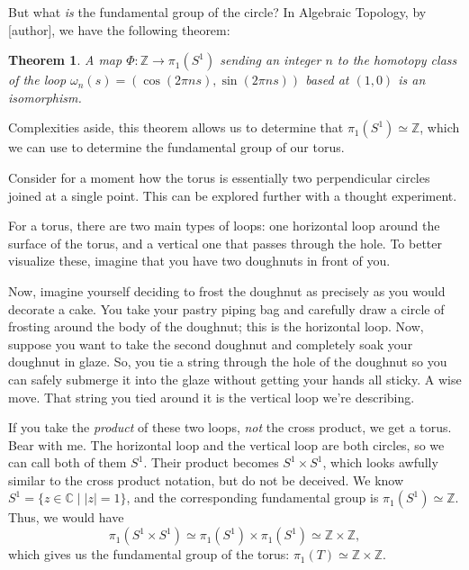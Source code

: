 \documentclass[12pt,a4paper,reqno,parskip=full]{amsart}
\numberwithin{equation}{section}
\theoremstyle{plain}
\newtheorem{theorem}[subsection]{Theorem}
\theoremstyle{definition}
\def\Z{{\mathbb Z}}
\def\C{{\mathbb C}}
\begin{document}
But what \textit{is} the fundamental group of the circle? In Algebraic Topology, by [author], we have the following theorem: %
\begin{theorem}
A map $\Phi:\Z\to\pi_1(S^1)$ sending an integer $n$ to the homotopy class of the loop $\omega_n(s)=(\cos(2\pi ns),\sin(2\pi ns))$ based at $(1,0)$ is an isomorphism.
\end{theorem}

Complexities aside, this theorem allows us to determine that $\pi_1(S^1)\simeq\Z$, which we can use to determine the fundamental group of our torus.

Consider for a moment how the torus is essentially two perpendicular circles joined at a single point. This can be explored further with a thought experiment.

For a torus, there are two main types of loops: one horizontal loop around the surface of the torus, and a vertical one that passes through the hole. To better visualize these, imagine that you have two doughnuts in front of you.

Now, imagine yourself deciding to frost the doughnut as precisely as you would decorate a cake. You take your pastry piping bag and carefully draw a circle of frosting around the body of the doughnut; this is the horizontal loop. Now, suppose you want to take the second doughnut and completely soak your doughnut in glaze. So, you tie a string through the hole of the doughnut so you can safely submerge it into the glaze without getting your hands all sticky. A wise move. That string you tied around it is the vertical loop we're describing.

If you take the \textit{product} of these two loops, \textit{not} the cross product, we get a torus. Bear with me. The horizontal loop and the vertical loop are both circles, so we can call both of them $S^1$. Their product becomes $S^1\times S^1$, which looks awfully similar to the cross product notation, but do not be deceived. We know $S^1=\{z\in\C\mid|z|=1\}$, and the corresponding fundamental group is $\pi_1(S^1)\simeq\Z$. Thus, we would have
\[\pi_1(S^1\times S^1)\simeq\pi_1(S^1)\times\pi_1(S^1)\simeq\Z\times\Z,\]
which gives us the fundamental group of the torus: $\pi_1(T)\simeq\Z\times\Z.$
\end{document}
